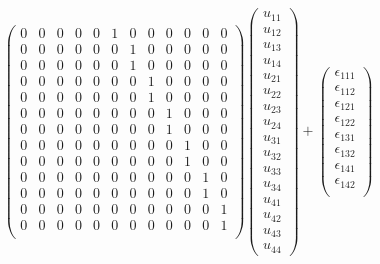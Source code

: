 \documentclass[11pt]{article}
\begin{document}
\[\begin{pmatrix}{}
  0 & 0 & 0 & 0 & 0 & 1 & 0 & 0 & 0 & 0 & 0 & 0 \\ 
  0 & 0 & 0 & 0 & 0 & 0 & 1 & 0 & 0 & 0 & 0 & 0 \\ 
  0 & 0 & 0 & 0 & 0 & 0 & 1 & 0 & 0 & 0 & 0 & 0 \\ 
  0 & 0 & 0 & 0 & 0 & 0 & 0 & 1 & 0 & 0 & 0 & 0 \\ 
  0 & 0 & 0 & 0 & 0 & 0 & 0 & 1 & 0 & 0 & 0 & 0 \\ 
  0 & 0 & 0 & 0 & 0 & 0 & 0 & 0 & 1 & 0 & 0 & 0 \\ 
  0 & 0 & 0 & 0 & 0 & 0 & 0 & 0 & 1 & 0 & 0 & 0 \\ 
  0 & 0 & 0 & 0 & 0 & 0 & 0 & 0 & 0 & 1 & 0 & 0 \\ 
  0 & 0 & 0 & 0 & 0 & 0 & 0 & 0 & 0 & 1 & 0 & 0 \\ 
  0 & 0 & 0 & 0 & 0 & 0 & 0 & 0 & 0 & 0 & 1 & 0 \\ 
  0 & 0 & 0 & 0 & 0 & 0 & 0 & 0 & 0 & 0 & 1 & 0 \\ 
  0 & 0 & 0 & 0 & 0 & 0 & 0 & 0 & 0 & 0 & 0 & 1 \\ 
  0 & 0 & 0 & 0 & 0 & 0 & 0 & 0 & 0 & 0 & 0 & 1 \\ 
  \end{pmatrix}
\begin{pmatrix} u_{11}\\ u_{12} \\ u_{13} \\ u_{14}\\
                u_{21}\\ u_{22} \\ u_{23} \\ u_{24}\\
                u_{31}\\ u_{32} \\ u_{33} \\ u_{34}\\
                u_{41}\\ u_{42} \\ u_{43} \\ u_{44}
\end{pmatrix} + \begin{pmatrix} \epsilon_{111} \\ \epsilon_{112} \\ \epsilon_{121} \\ \epsilon_{122} \\ \epsilon_{131} \\ \epsilon_{132} \\ \epsilon_{141} \\ \epsilon_{142} \\

\end{pmatrix}\]
\end{document}
